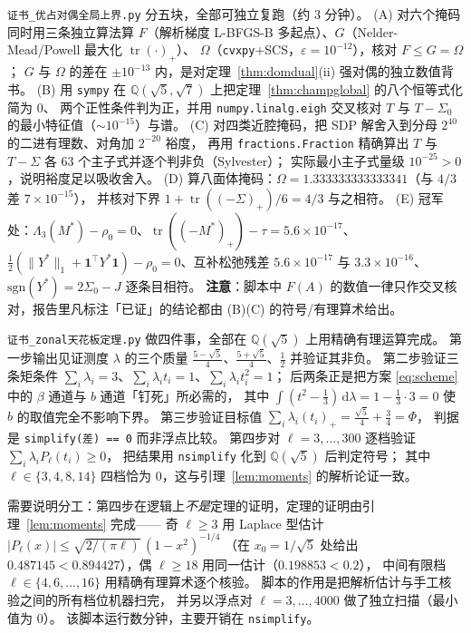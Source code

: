 \documentclass[UTF8,11pt]{ctexart}
\theoremstyle{definition}
\newcommand{\Lam}{\Lambda}
\newcommand{\tr}{\operatorname{tr}}
\newcommand{\dd}{\,\mathrm{d}}
\newcommand{\Q}{\mathbb{Q}}
\newcommand{\one}{\mathbf{1}}
\begin{document}
\texttt{证书\_优占对偶全局上界.py} 分五块，全部可独立复跑（约 $3$ 分钟）。
(A) 对六个掩码同时用三条独立算法算 $F$（解析梯度 L-BFGS-B 多起点）、$G$（Nelder-Mead/Powell 最大化 $\tr(\cdot)_+$）、
$\Omega$（\texttt{cvxpy}+SCS，$\varepsilon=10^{-12}$），核对 $F\le G=\Omega$；
$G$ 与 $\Omega$ 的差在 $\pm10^{-13}$ 内，是对定理~\ref{thm:domdual}(ii) 强对偶的独立数值背书。
(B) 用 \texttt{sympy} 在 $\Q(\sqrt5,\sqrt7)$ 上把定理~\ref{thm:champglobal} 的八个恒等式化简为 $0$、
两个正性条件判为正，并用 \texttt{numpy.linalg.eigh} 交叉核对 $T$ 与 $T-\Sigma_0$ 的最小特征值（$\sim10^{-15}$）与谱。
(C) 对四类近腔掩码，把 SDP 解舍入到分母 $2^{40}$ 的二进有理数、对角加 $2^{-20}$ 裕度，
再用 \texttt{fractions.Fraction} 精确算出 $T$ 与 $T-\Sigma$ 各 $63$ 个主子式并逐个判非负（Sylvester）；
实际最小主子式量级 $10^{-25}>0$，说明裕度足以吸收舍入。
(D) 算八面体掩码：$\Omega=1.333333333333341$（与 $4/3$ 差 $7\times10^{-15}$），
并核对下界 $1+\tr((-\Sigma)_+)/6=4/3$ 与之相符。
(E) 冠军处：$\Lam_3(M^*)-\rho_0=0$、$\tr((-M^*)_+)-\tau=5.6\times10^{-17}$、
$\frac12(\|Y^*\|_1+\one^\top Y^*\one)-\rho_0=0$、互补松弛残差 $5.6\times10^{-17}$ 与 $3.3\times10^{-16}$、
$\mathrm{sgn}(Y^*)=2\Sigma_0-J$ 逐条目相符。
\textbf{注意}：脚本中 $F(A)$ 的数值一律只作交叉核对，报告里凡标注「已证」的结论都由 (B)(C) 的符号/有理算术给出。

\texttt{证书\_zonal天花板定理.py} 做四件事，全部在 $\Q(\sqrt5)$ 上用精确有理运算完成。
第一步输出见证测度 $\lambda$ 的三个质量 $\frac{5-\sqrt5}4$、$\frac{5+\sqrt5}4$、$\frac12$ 并验证其非负。
第二步验证三条矩条件 $\sum_i\lambda_i=3$、$\sum_i\lambda_it_i=1$、$\sum_i\lambda_it_i^2=1$；
后两条正是把方案 \eqref{eq:scheme} 中的 $\beta$ 通道与 $b$ 通道「钉死」所必需的，
其中 $\int(t^2-\frac13)\dd\lambda=1-\frac13\cdot3=0$ 使 $b$ 的取值完全不影响下界。
第三步验证目标值 $\sum_i\lambda_i(t_i)_+=\frac{\sqrt5}4+\frac34=\Phi$，
判据是 \texttt{simplify(差)\,==\,0} 而非浮点比较。
第四步对 $\ell=3,\dots,300$ 逐档验证 $\sum_i\lambda_iP_\ell(t_i)\ge0$，
把结果用 \texttt{nsimplify} 化到 $\Q(\sqrt5)$ 后判定符号；
其中 $\ell\in\{3,4,8,14\}$ 四档恰为 $0$，这与引理~\ref{lem:moments} 的解析论证一致。

需要说明分工：第四步在逻辑上\emph{不是}定理的证明，定理的证明由引理~\ref{lem:moments} 完成——
奇 $\ell\ge3$ 用 Laplace 型估计 $|P_\ell(x)|\le\sqrt{2/(\pi\ell)}\,(1-x^2)^{-1/4}$
（在 $x_0=1/\sqrt5$ 处给出 $0.487145<0.894427$），偶 $\ell\ge18$ 用同一估计（$0.198853<0.2$），
中间有限档 $\ell\in\{4,6,\dots,16\}$ 用精确有理算术逐个核验。
脚本的作用是把解析估计与手工核验之间的所有档位机器扫完，
并另以浮点对 $\ell=3,\dots,4000$ 做了独立扫描（最小值为 $0$）。
该脚本运行数分钟，主要开销在 \texttt{nsimplify}。
\end{document}
